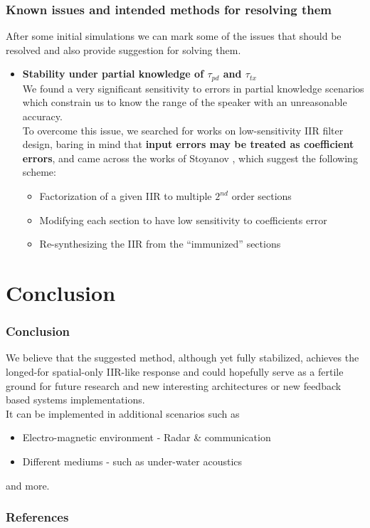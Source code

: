 \documentclass[10pt,pdflatex,headrule,landscape]{beamer}
\begin{document}
\begin{frame}
\frametitle{Known issues and intended methods for resolving them}
After some initial simulations we can mark some of the issues that should be resolved and also provide suggestion for solving them.
\begin{itemize}
\item
{
\textbf{Stability under partial knowledge of $ \tau_{pd} $ and $ \tau_{tx} $}
\\
We found a very significant sensitivity to errors in partial knowledge scenarios which constrain us to know the range of the speaker with an unreasonable accuracy.
\\
To overcome this issue, we searched for works on low-sensitivity IIR filter design, baring in mind that \textbf{input errors may be treated as coefficient errors}, and came across the works of Stoyanov \cite{I.P.Topalov1990LOW-SENSITIVITYCYCLES,StoyanovNEWSECTIONS}, which suggest the following scheme:
\begin{itemize}
\item{Factorization of a given IIR to multiple $ 2^{nd} $ order sections}
\item{Modifying each section to have low sensitivity to coefficients error}
\item{Re-synthesizing the IIR from the ``immunized'' sections}
\end{itemize}
}
\end{itemize}
\end{frame}

\section{Conclusion}

\begin{frame}
\frametitle{Conclusion}
We believe that the suggested method, although yet fully stabilized, achieves the longed-for spatial-only IIR-like response and could hopefully serve as a fertile ground for future research and new interesting architectures or new feedback based systems implementations. 
\\
It can be implemented in additional scenarios such as 
\begin{itemize}
\item{Electro-magnetic environment - Radar \& communication}
\item{Different mediums - such as under-water acoustics}
\end{itemize}
and more.
\end{frame}


\begin{frame}[allowframebreaks]
\frametitle{References}

\tiny{}
\end{frame}
\end{document}
